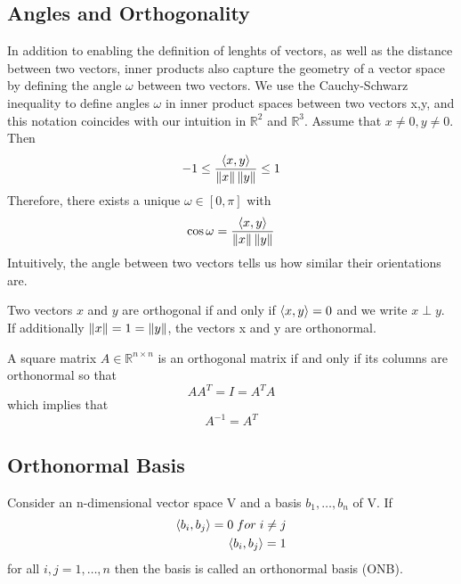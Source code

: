 \subsection*{Angles and Orthogonality}
In addition to enabling the definition of lenghts of vectors, as well as the distance between two vectors, inner products also capture the geometry of a vector space by defining the angle $\omega$ between two vectors. We use the Cauchy-Schwarz inequality to define angles $\omega$ in inner product spaces between two vectors x,y, and this notation coincides with our intuition in $\mathbb{R}^2$ and $\mathbb{R}^3$. Assume that $x \neq 0, y\neq 0$. Then 
\[ 
    -1 \leq \frac{\left\langle x,y\right\rangle}{\left\lVert x\right\rVert\left\lVert y\right\rVert} \leq 1 
\]
Therefore, there exists a unique $\omega \in [0,\pi]$ with 
\[ 
    \cos{\omega} = \frac{\left\langle x,y\right\rangle}{\left\lVert x\right\rVert\left\lVert y\right\rVert}
\]Intuitively, the angle between two vectors tells us how similar their orientations are.
\begin{definition}[Orthogonality]
    Two vectors $x$ and $y$ are orthogonal if and only if $\left\langle x,y\right\rangle = 0$ and we write $x \perp y$. If additionally $\left\lVert x\right\rVert = 1 = \left\lVert y\right\rVert$, the vectors x and y are orthonormal.
\end{definition}
\begin{definition}
    A square matrix $A \in \mathbb{R}^{n\times n}$ is an orthogonal matrix if and only if its columns are orthonormal so that 
    \[ 
        AA^T = I = A^TA 
    \]which implies that
    \[ 
        A^{-1} = A^T 
    \]
\end{definition}
\subsection*{Orthonormal Basis}
\begin{definition}
    Consider an n-dimensional vector space V and a basis $b_{1}, \ldots,b_{n}$ of V. If 
    \begin{align*}
        \left\langle b_i,b_j\right\rangle = 0 \; for \; i\neq j \\
        \left\langle b_i,b_j\right\rangle = 1
    \end{align*}
    for all $i,j = 1, \ldots, n$ then the basis is called an orthonormal basis (ONB).
\end{definition}